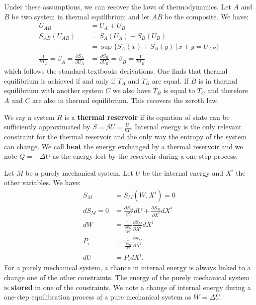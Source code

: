 \documentclass[letterpaper]{article}
\begin{document}
Under these assumptions, we can recover the laws of thermodynamics. Let $A$ and $B$ be two system in thermal equilibrium and let $AB$ be the composite. We have:
\begin{equation}
	\begin{aligned}
	U_{AB} &= U_A + U_B \\
	S_{AB}(U_{AB}) &= S_A(U_A) + S_B(U_B) \\
	&= \sup \{S_A(x) + S_B(y) \, | \, x+y= U_{AB}\} \\
	\frac{1}{kT_A} = \beta_A = \frac{\partial S_A}{\partial U_A} &= \frac{\partial S_B}{\partial U_B} = \beta_B = \frac{1}{kT_B}
	\end{aligned}
\end{equation}
which follows the standard textbooks derivations. One finds that thermal equilibrium is achieved if and only if $T_A$ and $T_B$ are equal.  If $B$ is in thermal equilibrium with another system $C$ we also have $T_B$ is equal to $T_C$ and therefore $A$ and $C$ are also in thermal equilibrium. This recovers the zeroth law.

We say a system $R$ is a \textbf{thermal reservoir} if its equation of state can be sufficiently approximated by $S = \beta U = \frac{U}{k T}$. Internal energy is the only relevant constraint for the thermal reservoir and the only way the entropy of the system can change. We call \textbf{heat} the energy exchanged by a thermal reservoir and we note $Q = - \Delta U$ as the energy lost by the reservoir during a one-step process.

Let $M$ be a purely mechanical system. Let $U$ be the internal energy and $X^i$ the other variables. We have:
\begin{equation}
\begin{aligned}
S_M&=S_M(W, X^i)=0 \\
dS_M = 0 &= \frac{\partial S_M}{\partial U} dU + \frac{\partial S_M}{\partial X^i} dX^i \\
dW &= \frac{1}{\frac{\partial S_M}{\partial U}}\frac{\partial S_M}{\partial X^i} dX^i \\
P_i &= \frac{1}{\frac{\partial S_M}{\partial U}}\frac{\partial S_M}{\partial X^i} \\
dU &= P_i dX^i.
\end{aligned}
\end{equation}
For a purely mechanical system, a chance in internal energy is always linked to a change one of the other constraints. The energy of the purely mechanical system is \textbf{stored} in one of the constraints. We note a change of internal energy during a one-step equilibration process of a pure mechanical system as $W=\Delta U$.
\end{document}
